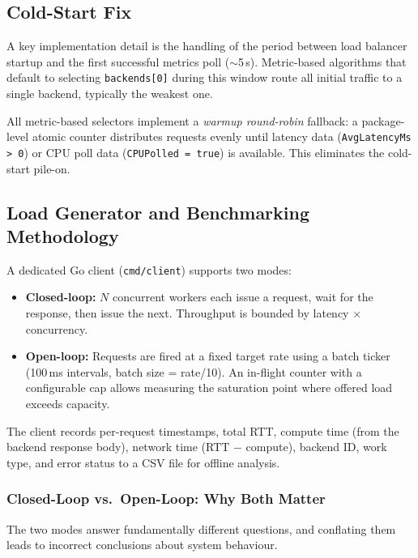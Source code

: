 \documentclass[12pt]{article}
\begin{document}
\subsection{Cold-Start Fix}

A key implementation detail is the handling of the period between load balancer
startup and the first successful metrics poll ($\sim$5\,s). Metric-based
algorithms that default to selecting \texttt{backends[0]} during this window
route all initial traffic to a single backend, typically the weakest one.

All metric-based selectors implement a \textit{warmup round-robin} fallback:
a package-level atomic counter distributes requests evenly until latency data
(\texttt{AvgLatencyMs > 0}) or CPU poll data (\texttt{CPUPolled = true}) is
available. This eliminates the cold-start pile-on.

\subsection{Load Generator and Benchmarking Methodology}

A dedicated Go client (\texttt{cmd/client}) supports two modes:
\begin{itemize}
  \item \textbf{Closed-loop:} $N$ concurrent workers each issue a request,
        wait for the response, then issue the next. Throughput is bounded by
        latency $\times$ concurrency.
  \item \textbf{Open-loop:} Requests are fired at a fixed target rate using a
        batch ticker (100\,ms intervals, batch size = rate/10). An in-flight
        counter with a configurable cap allows measuring the saturation point
        where offered load exceeds capacity.
\end{itemize}

The client records per-request timestamps, total RTT, compute time
(from the backend response body), network time (RTT $-$ compute), backend ID,
work type, and error status to a CSV file for offline analysis.

\subsubsection*{Closed-Loop vs.\ Open-Loop: Why Both Matter}

The two modes answer fundamentally different questions, and conflating them
leads to incorrect conclusions about system behaviour.
\end{document}
